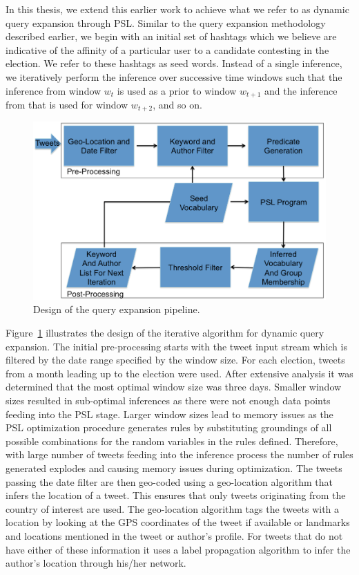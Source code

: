 In this thesis, we extend this earlier work to achieve what we refer to as dynamic query expansion through PSL. 
Similar to the query expansion methodology described earlier, we begin with an initial set of 
hashtags which we believe are indicative of the affinity of a particular user to a candidate 
contesting in the election.
We refer to these hashtags as seed words.
Instead of a single inference, we iteratively perform the inference over successive time windows such that the inference from window $w_t$ is used as a prior to window $w_{t+1}$ and the inference from that is used for window $w_{t+2}$, and so on.
\begin{figure}[Ht]
	\centering
	\includegraphics[height=0.5\textheight, width=1.0\textwidth]{support_files/flowChart.png}
	\caption{Design of the query expansion pipeline.}
	\label{fig:flowchart}
\end{figure}
Figure~\ref{fig:flowchart} illustrates the design of the iterative algorithm for dynamic query expansion.
The initial pre-processing starts with the tweet input stream which is filtered by the date range specified by the window size. 
For each election, tweets from a month leading up to the election were used.
After extensive analysis it was determined that the most optimal window size was three days. 
Smaller window sizes resulted in sub-optimal inferences as there were not enough data points feeding into the PSL stage.
Larger window sizes lead to memory issues as the PSL optimization procedure generates rules by substituting groundings of all possible combinations for the random variables in the rules defined.
Therefore, with large number of tweets feeding into the inference process the number of rules generated explodes and causing memory issues during optimization. 
The tweets passing the date filter are then geo-coded using a geo-location algorithm that infers the location of a tweet. 
This ensures that only tweets originating from the country of interest are used.
The geo-location algorithm tags the tweets with a location by looking at the GPS coordinates of the tweet if available or landmarks and locations mentioned in the tweet or author's profile. 
For tweets that do not have either of these information it uses a label propagation algorithm to infer the author's location through his/her network.

